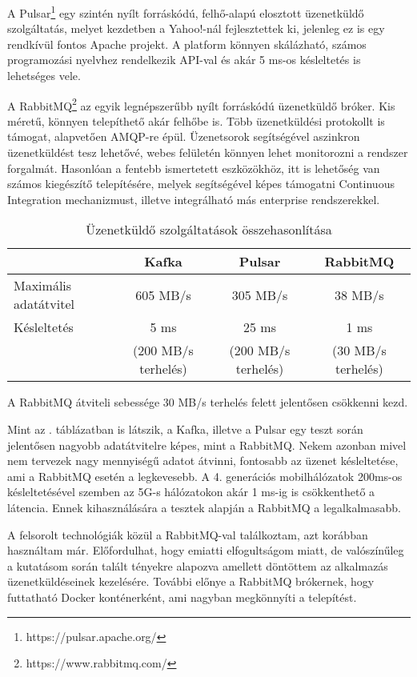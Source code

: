 \documentclass[11pt,a4paper,oneside]{article}
\begin{document}
A Pulsar\footnote{https://pulsar.apache.org/} egy szintén nyílt forráskódú, felhő-alapú elosztott üzenetküldő szolgáltatás, melyet kezdetben a Yahoo!-nál fejlesztettek ki, jelenleg ez is egy rendkívül fontos Apache projekt. A platform könnyen skálázható, számos programozási nyelvhez rendelkezik API-val és akár 5 ms-os késleltetés is lehetséges vele.

A RabbitMQ\footnote{https://www.rabbitmq.com/} az egyik legnépszerűbb nyílt forráskódú üzenetküldő bróker. Kis méretű, könnyen telepíthető akár felhőbe is. Több üzenetküldési protokollt is támogat, alapvetően AMQP-re épül. Üzenetsorok segítségével aszinkron üzenetküldést tesz lehetővé, webes felületén könnyen lehet monitorozni a rendszer forgalmát. Hasonlóan a fentebb ismertetett eszközökhöz, itt is lehetőség van számos kiegészítő telepítésére, melyek segítségével képes támogatni Continuous Integration mechanizmust, illetve integrálható más enterprise rendszerekkel.

\begin{table}
  \caption{Üzenetküldő szolgáltatások összehasonlítása}
  \label{table:compare_brokers}
  \begin{tabular}{l|c|c|c}
    & Kafka & Pulsar & RabbitMQ\\
    \hline
    \hline
    Maximális adatátvitel & 605 MB/s & 305 MB/s & 38 MB/s \\
    \hline
    Késleltetés & 5 ms & 25 ms & 1 ms\\
    & (200 MB/s terhelés) & (200 MB/s terhelés) & (30 MB/s terhelés)
  \end{tabular}
  A RabbitMQ átviteli sebessége 30 MB/s terhelés felett jelentősen csökkenni kezd.
\end{table}

Mint az . táblázatban is látszik, a Kafka, illetve a Pulsar egy teszt során jelentősen nagyobb adatátvitelre képes, mint a RabbitMQ. Nekem azonban mivel nem tervezek nagy mennyiségű adatot átvinni, fontosabb az üzenet késleltetése, ami a RabbitMQ esetén a legkevesebb. A 4. generációs mobilhálózatok 200ms-os késleltetésével szemben az 5G-s hálózatokon akár 1 ms-ig is csökkenthető a látencia. Ennek kihasználására a tesztek alapján a RabbitMQ a legalkalmasabb.

A felsorolt technológiák közül a RabbitMQ-val találkoztam, azt korábban használtam már. Előfordulhat, hogy emiatti elfogultságom miatt, de valószínűleg a kutatásom során talált tényekre alapozva amellett döntöttem az alkalmazás üzenetküldéseinek kezelésére. További előnye a RabbitMQ brókernek, hogy futtatható Docker konténerként, ami nagyban megkönnyíti a telepítést.
\end{document}
